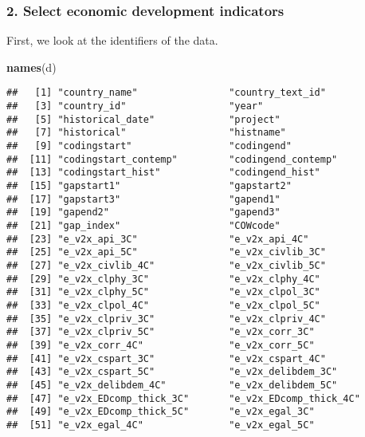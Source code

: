 \documentclass[
]{article}
\newenvironment{Shaded}{\begin{snugshade}}{\end{snugshade}}
\newcommand{\FunctionTok}[1]{\textcolor[rgb]{0.13,0.29,0.53}{\textbf{#1}}}
\newcommand{\NormalTok}[1]{#1}
\begin{document}
\hypertarget{select-economic-development-indicators}{%
\subsubsection{2. Select economic development
indicators}\label{select-economic-development-indicators}}

First, we look at the identifiers of the data.

\begin{Shaded}
\begin{Highlighting}[]
\FunctionTok{names}\NormalTok{(d)}
\end{Highlighting}
\end{Shaded}

\begin{verbatim}
##   [1] "country_name"                "country_text_id"            
##   [3] "country_id"                  "year"                       
##   [5] "historical_date"             "project"                    
##   [7] "historical"                  "histname"                   
##   [9] "codingstart"                 "codingend"                  
##  [11] "codingstart_contemp"         "codingend_contemp"          
##  [13] "codingstart_hist"            "codingend_hist"             
##  [15] "gapstart1"                   "gapstart2"                  
##  [17] "gapstart3"                   "gapend1"                    
##  [19] "gapend2"                     "gapend3"                    
##  [21] "gap_index"                   "COWcode"                    
##  [23] "e_v2x_api_3C"                "e_v2x_api_4C"               
##  [25] "e_v2x_api_5C"                "e_v2x_civlib_3C"            
##  [27] "e_v2x_civlib_4C"             "e_v2x_civlib_5C"            
##  [29] "e_v2x_clphy_3C"              "e_v2x_clphy_4C"             
##  [31] "e_v2x_clphy_5C"              "e_v2x_clpol_3C"             
##  [33] "e_v2x_clpol_4C"              "e_v2x_clpol_5C"             
##  [35] "e_v2x_clpriv_3C"             "e_v2x_clpriv_4C"            
##  [37] "e_v2x_clpriv_5C"             "e_v2x_corr_3C"              
##  [39] "e_v2x_corr_4C"               "e_v2x_corr_5C"              
##  [41] "e_v2x_cspart_3C"             "e_v2x_cspart_4C"            
##  [43] "e_v2x_cspart_5C"             "e_v2x_delibdem_3C"          
##  [45] "e_v2x_delibdem_4C"           "e_v2x_delibdem_5C"          
##  [47] "e_v2x_EDcomp_thick_3C"       "e_v2x_EDcomp_thick_4C"      
##  [49] "e_v2x_EDcomp_thick_5C"       "e_v2x_egal_3C"              
##  [51] "e_v2x_egal_4C"               "e_v2x_egal_5C"              

\end{verbatim}
\end{document}
